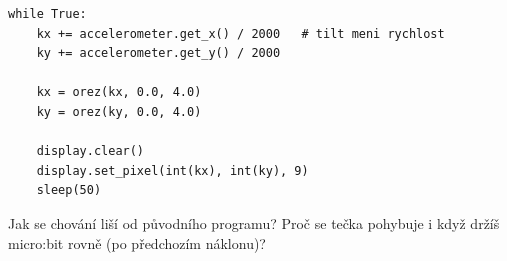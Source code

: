 \begin{bonusukol}
\begin{enumerate}
\begin{lstlisting}
while True:
    kx += accelerometer.get_x() / 2000   # tilt meni rychlost
    ky += accelerometer.get_y() / 2000

    kx = orez(kx, 0.0, 4.0)
    ky = orez(ky, 0.0, 4.0)

    display.clear()
    display.set_pixel(int(kx), int(ky), 9)
    sleep(50)
\end{lstlisting}
        Jak se chování liší od původního programu? Proč se tečka pohybuje
        i když držíš micro:bit rovně (po předchozím náklonu)?
\end{enumerate}

\odpoved[3cm]

\end{bonusukol}


